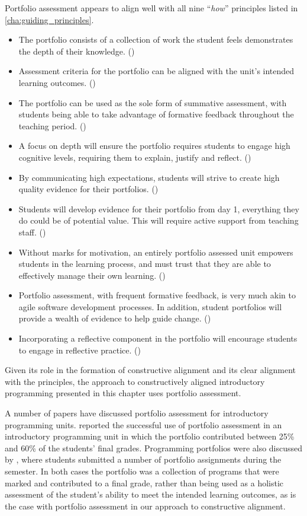 Portfolio assessment appears to align well with all nine ``\emph{how}'' principles listed in \cref{cha:guiding_principles}. 
\begin{itemize}[noitemsep,nolistsep]
	\item The portfolio consists of a collection of work the student feels demonstrates the depth of their knowledge. ()
	\item Assessment criteria for the portfolio can be aligned with the unit's intended learning outcomes. ()
	\item The portfolio can be used as the sole form of summative assessment, with students being able to take advantage of formative feedback throughout the teaching period. ()
	\item A focus on depth will ensure the portfolio requires students to engage high cognitive levels, requiring them to explain, justify and reflect. ()
	\item By communicating high expectations, students will strive to create high quality evidence for their portfolios. ()
	\item Students will develop evidence for their portfolio from day 1, everything they do could be of potential value. This will require active support from teaching staff. ()
	\item Without marks for motivation, an entirely portfolio assessed unit empowers students in the learning process, and must trust that they are able to effectively manage their own learning. ()
	\item Portfolio assessment, with frequent formative feedback, is very much akin to agile software development processes. In addition, student portfolios will provide a wealth of evidence to help guide change. ()
	\item Incorporating a reflective component in the portfolio will encourage students to engage in reflective practice. ()
\end{itemize}

Given its role in the formation of constructive alignment and its clear alignment with the principles, the approach to constructively aligned introductory programming presented in this chapter uses portfolio assessment.

A number of papers have discussed portfolio assessment for introductory programming units. \cite{Plimmer:2000} reported the successful use of portfolio assessment in an introductory programming unit in which the portfolio contributed between 25\% and 60\% of the students' final grades. Programming portfolios were also discussed by \cite{Jones:2010}, where students submitted a number of portfolio assignments during the semester. In both cases the portfolio was a collection of programs that were marked and contributed to a final grade, rather than being used as a holistic assessment of the student's ability to meet the intended learning outcomes, as is the case with portfolio assessment in our approach to constructive alignment. 


